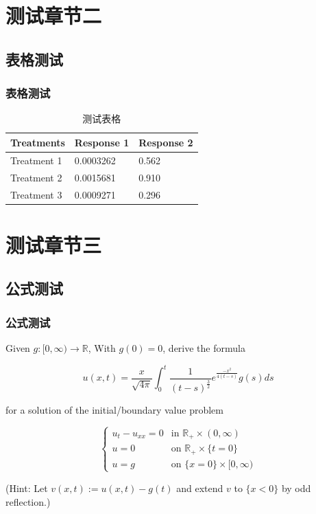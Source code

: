 \documentclass[presentation,aspectratio=1610]{beamer}
\begin{document}

\section{测试章节二}
\subsection{表格测试}

\begin{frame}
\frametitle{表格测试}
\begin{table}
\begin{tabular}{l l l}
\toprule
\textbf{Treatments} & \textbf{Response 1} & \textbf{Response 2}\\
\midrule
Treatment 1 & 0.0003262 & 0.562 \\
Treatment 2 & 0.0015681 & 0.910 \\
Treatment 3 & 0.0009271 & 0.296 \\
\bottomrule
\end{tabular}
\caption{测试表格}
\end{table}
\end{frame}

\section{测试章节三}

\subsection{公式测试}

\begin{frame}
\frametitle{公式测试}
Given $ g:[0,∞) \to\mathbb{R} $, With $ g(0)=0 $, derive the formula

\begin{equation}
	u(x,t)=\frac{x}{\sqrt{4\pi}}\int_{0}^{t}\frac{1}{(t-s)^{\frac{3}{2}}}e^{\frac{-x^2}{4(t-s)}}g(s)ds
\end{equation}

for a solution of the initial/boundary value problem 

\[
	\begin{cases}
		u_t-u_{xx}  = 0   & \mbox{in }  \mathbb{R}_+ \times(0,\infty)\\
		u           = 0   & \mbox{on }  \mathbb{R}_+ \times\{t=0\}\\
		u           = g   & \mbox{on }  \{x=0\}\times[0,\infty)
	\end{cases}
\]

(Hint: Let $v(x, t) := u(x, t) − g(t)$ and extend $v$ to $\{x < 0\}$ by odd reflection.)
\end{frame}
\end{document}

